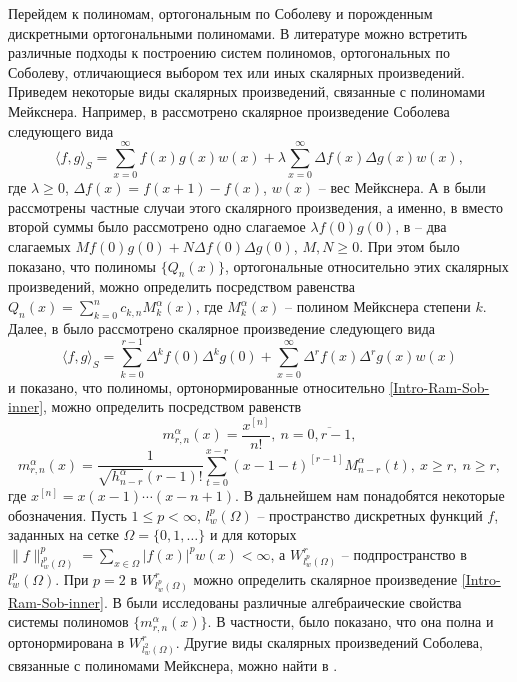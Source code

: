 Перейдем к полиномам, ортогональным по Соболеву и порожденным дискретными ортогональными полиномами. В литературе можно встретить различные подходы к построению систем полиномов, ортогональных по Соболеву, отличающиеся выбором тех или иных скалярных произведений. Приведем некоторые виды скалярных произведений, связанные с полиномами Мейкснера. Например, в \cite{Ram-Ar-Go-Mar, Ram-Kh-Old} рассмотрено скалярное произведение Соболева следующего вида
$$
\langle f,g\rangle_S=\sum_{x=0}^{\infty}f(x)g(x)w(x)+\lambda\sum_{x=0}^{\infty}\Delta f(x)\Delta g(x)w(x),
$$
где $\lambda\ge 0$, $\Delta f(x)=f(x+1)-f(x)$, $w(x)$ -- вес Мейкснера. А в \cite{Ram-Bav1, Ram-Bav2} были рассмотрены частные случаи этого скалярного произведения, а именно, в \cite{Ram-Bav1} вместо второй суммы было рассмотрено одно слагаемое $\lambda f(0)g(0)$, в \cite{Ram-Bav2} -- два слагаемых $Mf(0)g(0)+N\Delta f(0)\Delta g(0)$, $M,N\ge 0$. При этом было показано, что полиномы $\{Q_n(x)\}$, ортогональные относительно этих скалярных произведений, можно определить посредством равенства $Q_n(x)=\sum_{k=0}^{n}c_{k,n}M_k^\alpha(x)$, где $M_k^\alpha(x)$ -- полином Мейкснера степени $k$. Далее, в \cite{Ram-Shar-VMJ, Ram-Shar-Sar} было рассмотрено скалярное произведение следующего вида
\begin{equation}\label{Intro-Ram-Sob-inner}
\langle f,g\rangle_S=\sum_{k=0}^{r-1}\Delta^kf(0)\Delta^kg(0)+\sum_{x=0}^\infty\Delta^rf(x)\Delta^rg(x)w(x)
\end{equation}
и показано, что полиномы, ортонормированные относительно \eqref{Intro-Ram-Sob-inner}, можно определить посредством равенств
$$
m_{r,n}^{\alpha}(x)=\frac{x^{[n]}}{n!},\ n=\overline{0,r-1},
$$
$$
m_{r,n}^{\alpha}(x)=
\frac{1}{\sqrt{h_{n-r}^\alpha}(r-1)!}\sum_{t=0}^{x-r}(x-1-t)^{[r-1]}M_{n-r}^\alpha(t),\ x\ge r,\ n\ge r,
$$
где $x^{[n]}=x(x-1)\cdots(x-n+1)$.
В дальнейшем нам понадобятся некоторые обозначения. Пусть $1\le p<\infty$, $l_w^p(\Omega)$ -- пространство дискретных функций $f$, заданных на сетке $\Omega=\{0, 1, \ldots\}$ и для которых $\|f\|_{l_{w}^p(\Omega)}^p=\sum_{x\in\Omega}|f(x)|^pw(x)<\infty$, а $W^r_{l_{w}^p(\Omega)}$ -- подпространство в $l_{w}^p(\Omega)$. При $p=2$ в $W^r_{l_{w}^p(\Omega)}$ можно определить скалярное произведение \eqref{Intro-Ram-Sob-inner}.
В \cite{Ram-Shar-Sar} были исследованы различные алгебраические свойства системы полиномов $\{m_{r,n}^{\alpha}(x)\}$. В частности, было показано, что она полна и ортонормирована в $W^r_{l_w^2(\Omega)}$.
Другие виды скалярных произведений Соболева, связанные с полиномами Мейкснера, можно найти в \cite{Ram-Mor-Bal, Ram-Co-So-Vil}.
